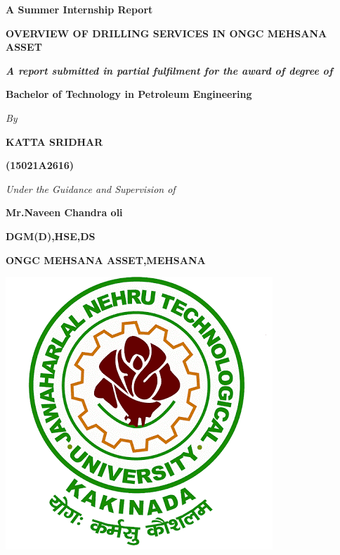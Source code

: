 \documentclass[11pt,a4paper]{report}
\makeatletter
\newcommand\frontmatter{%
    \cleardoublepage
  \pagenumbering{roman}}
\makeatother
\begin{document}
\frontmatter

\begin{titlepage}
\begin{center}

\textbf{A Summer Internship Report}

\vspace{1em}

\large \textbf{OVERVIEW OF DRILLING SERVICES IN ONGC MEHSANA ASSET}

\vspace{3em}

\large \textit{\textbf{A report submitted in partial fulfilment for the award of degree of}}

\vspace{1em}

\textbf{Bachelor of Technology in Petroleum Engineering}

\vspace{3em}

\textit{By}

\vspace{1em}

\textbf{KATTA SRIDHAR}
    
\textbf{(15021A2616)}

\vspace{2em}

\textit{Under the Guidance and Supervision of}

\vspace{1em}

\textbf{Mr.Naveen Chandra oli}

\textbf{DGM(D),HSE,DS}

\textbf{ONGC MEHSANA ASSET,MEHSANA}

\vspace{2em}

\includegraphics[scale=0.3]{jntuk1}


\end{center}
\end{titlepage}
\end{document}
